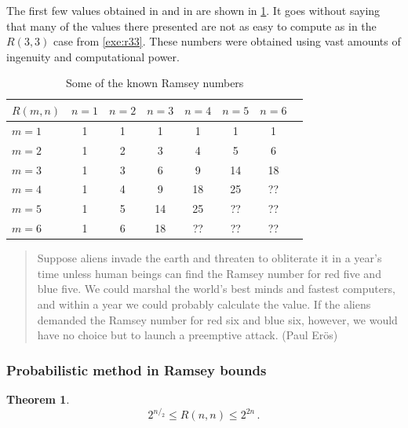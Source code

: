 \documentclass[12pt]{amsart}
\theoremstyle{definition}
\newtheorem{thm}{Theorem}[section]
\begin{document}
The first few values obtained in \cite{chachamis2018ramsey} and in \cite{graver1968some} are shown in \cref{tab:ramsey_nums}.
It goes without saying that many of the values there presented are not as easy to compute as in the $R(3, 3)$ case from \cref{exe:r33}.
These numbers were obtained using vast amounts of ingenuity and computational power.

\begin{table}
\begin{tabular}{l|| c | c | c | c | c | c | c}
$R(m, n)$& $n = 1 $ & $n = 2 $ &$n = 3 $ &$n = 4 $ &$n = 5 $ & $n = 6$\\
\hline
$ m = 1 $& 1 & 1 & 1 & 1 & 1 & 1\\
$ m = 2 $& 1 & 2 & 3 & 4 & 5 & 6\\
$ m = 3 $& 1 & 3 & 6 & 9 & 14 & 18\\
$ m = 4 $& 1 & 4 & 9 & 18 & 25 & ??\\
$ m = 5 $& 1 & 5 & 14 & 25 & ?? & ??\\
$ m = 6 $& 1 & 6 & 18 & ?? & ?? & ??
\end{tabular}
\caption{Some of the known Ramsey numbers\label{tab:ramsey_nums}}
\end{table}


\begin{quote}
Suppose aliens invade the earth and threaten to obliterate it in a year's time unless human beings can find the Ramsey number for red five and blue five. We could marshal the world's best minds and fastest computers, and within a year we could probably calculate the value. If the aliens demanded the Ramsey number for red six and blue six, however, we would have no choice but to launch a preemptive attack.
\hfill (Paul Er\"os)
\end{quote}

\subsubsection{Probabilistic method in Ramsey bounds}
\begin{thm}
$$2^{n/_2} \leq R(n, n) \leq 2^{2n}\, . $$

\end{thm}
\end{document}
